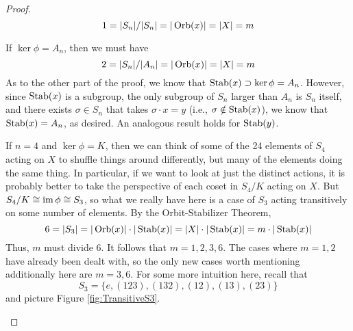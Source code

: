 \documentclass[../notes.tex]{subfiles}
\begin{document}
\begin{itemize}
\begin{proof}
        \begin{equation*}
            1 = |S_n|/|S_n| = |\operatorname{Orb}(x)| = |X| = m
        \end{equation*}\par
        If $\ker\phi=A_n$, then we must have
        \begin{equation*}
            2 = |S_n|/|A_n| = |\operatorname{Orb}(x)| = |X| = m
        \end{equation*}
        As to the other part of the proof, we know that $\operatorname{Stab}(x)\supset\ker\phi=A_n$. However, since $\operatorname{Stab}(x)$ is a subgroup, the only subgroup of $S_n$ larger than $A_n$ is $S_n$ itself, and there exists $\sigma\in S_n$ that takes $\sigma\cdot x=y$ (i.e., $\sigma\notin\operatorname{Stab}(x)$), we know that $\operatorname{Stab}(x)=A_n$, as desired. An analogous result holds for $\operatorname{Stab}(y)$.\par
        If $n=4$ and $\ker\phi=K$, then we can think of some of the 24 elements of $S_4$ acting on $X$ to shuffle things around differently, but many of the elements doing the same thing. In particular, if we want to look at just the distinct actions, it is probably better to take the perspective of each coset in $S_4/K$ acting on $X$. But $S_4/K\cong\operatorname{im}\phi\cong S_3$, so what we really have here is a case of $S_3$ acting transitively on some number of elements. By the Orbit-Stabilizer Theorem,
        \begin{equation*}
            6 = |S_3|
            = |\operatorname{Orb}(x)|\cdot|\operatorname{Stab}(x)|
            = |X|\cdot|\operatorname{Stab}(x)|
            = m\cdot|\operatorname{Stab}(x)|
        \end{equation*}
        Thus, $m$ must divide 6. It follows that $m=1,2,3,6$. The cases where $m=1,2$ have already been dealt with, so the only new cases worth mentioning additionally here are $m=3,6$. For some more intuition here, recall that
        \begin{equation*}
            S_3 = \{e,(123),(132),(12),(13),(23)\}
        \end{equation*}
        and picture Figure \ref{fig:TransitiveS3}.
        \begin{figure}[H]
            \centering
            \footnotesize
            \begin{subfigure}[b]{0.3\linewidth}
                \centering
\end{subfigure}
\end{figure}
\end{proof}
\end{itemize}
\end{document}
